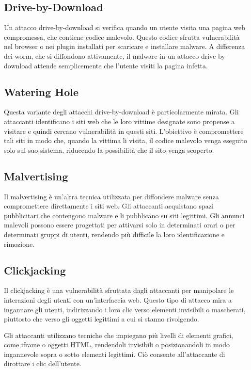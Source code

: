 \subsection{Drive-by-Download}

Un attacco drive-by-download si verifica quando un utente visita una pagina web compromessa, che contiene codice malevolo. Questo codice sfrutta vulnerabilità nel browser o nei plugin installati per scaricare e installare malware. A differenza dei worm, che si diffondono attivamente, il malware in un attacco drive-by-download attende semplicemente che l'utente visiti la pagina infetta.

\subsection{Watering Hole}

Questa variante degli attacchi drive-by-download è particolarmente mirata. Gli attaccanti identificano i siti web che le loro vittime designate sono propense a visitare e quindi cercano vulnerabilità in questi siti. L'obiettivo è compromettere tali siti in modo che, quando la vittima li visita, il codice malevolo venga eseguito solo sul suo sistema, riducendo la possibilità che il sito venga scoperto.

\subsection{Malvertising}

Il malvertising è un'altra tecnica utilizzata per diffondere malware senza compromettere direttamente i siti web. Gli attaccanti acquistano spazi pubblicitari che contengono malware e li pubblicano su siti legittimi. Gli annunci malevoli possono essere progettati per attivarsi solo in determinati orari o per determinati gruppi di utenti, rendendo più difficile la loro identificazione e rimozione.

\subsection{Clickjacking}

Il clickjacking è una vulnerabilità sfruttata dagli attaccanti per manipolare le interazioni degli utenti con un'interfaccia web. Questo tipo di attacco mira a ingannare gli utenti, indirizzando i loro clic verso elementi invisibili o mascherati, piuttosto che verso gli oggetti legittimi a cui si stanno rivolgendo.

Gli attaccanti utilizzano tecniche che impiegano più livelli di elementi grafici, come iframe o oggetti HTML, rendendoli invisibili o posizionandoli in modo ingannevole sopra o sotto elementi legittimi. Ciò consente all'attaccante di dirottare i clic dell'utente.

